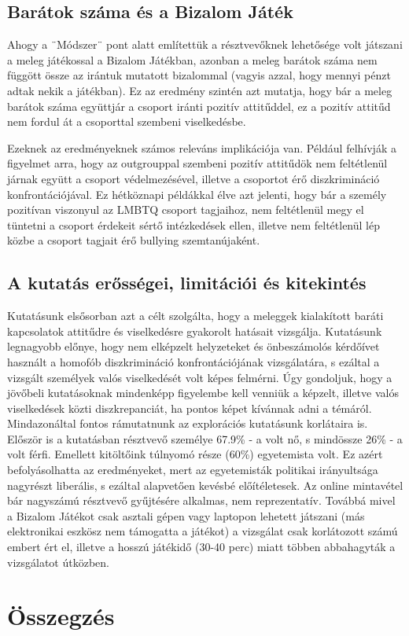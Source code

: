 \subsection{Barátok száma és a Bizalom Játék}
Ahogy a ¨Módszer¨ pont alatt említettük a résztvevőknek lehetősége volt játszani a meleg játékossal a Bizalom Játékban, azonban a meleg barátok száma nem függött össze az irántuk mutatott bizalommal (vagyis azzal, hogy mennyi pénzt adtak nekik a játékban). Ez az eredmény szintén azt mutatja, hogy bár a meleg barátok száma együttjár a csoport iránti pozitív attitűddel, ez a pozitív attitűd nem fordul át a csoporttal szembeni viselkedésbe. 
\par 
Ezeknek az eredményeknek számos releváns implikációja van. Például felhívják a figyelmet arra, hogy az outgrouppal szembeni pozitív attitűdök nem feltétlenül járnak együtt a csoport védelmezésével, illetve a csoportot érő diszkrimináció konfrontációjával. Ez hétköznapi példákkal élve azt jelenti, hogy bár a személy pozitívan viszonyul az LMBTQ csoport tagjaihoz, nem feltétlenül megy el tüntetni a csoport érdekeit sértő intézkedések ellen, illetve nem feltétlenül lép közbe a csoport tagjait érő bullying szemtanújaként.

\subsection{A kutatás erősségei, limitációi és kitekintés}
Kutatásunk elsősorban azt a célt szolgálta, hogy a meleggek kialakított baráti kapcsolatok attitűdre és viselkedésre gyakorolt hatásait vizsgálja.
Kutatásunk legnagyobb előnye, hogy nem elképzelt helyzeteket és önbeszámolós kérdőívet használt a homofób diszkrimináció konfrontációjának vizsgálatára, s ezáltal a vizsgált személyek valós viselkedését volt képes felmérni. Úgy gondoljuk, hogy a jövőbeli kutatásoknak mindenképp figyelembe kell venniük a képzelt, illetve valós viselkedések közti diszkrepanciát, ha pontos képet kívánnak adni a témáról.
Mindazonáltal fontos rámutatnunk az explorációs kutatásunk korlátaira is. Először is a kutatásban résztvevő személye 67.9\% - a volt nő, s mindössze 26\% - a volt férfi. Emellett kitöltőink túlnyomó része (60\%) egyetemista volt. Ez azért befolyásolhatta az eredményeket, mert az egyetemisták politikai irányultsága nagyrészt liberális, s ezáltal alapvetően kevésbé előítéletesek. Az online mintavétel bár nagyszámú résztvevő gyűjtésére alkalmas, nem reprezentatív. Továbbá mivel a Bizalom Játékot csak asztali gépen vagy laptopon lehetett játszani (más elektronikai eszkösz nem támogatta a játékot) a vizsgálat csak korlátozott számú embert ért el, illetve a hosszú játékidő (30-40 perc) miatt többen abbahagyták a vizsgálatot útközben. 

\pagebreak
\section{Összegzés}

